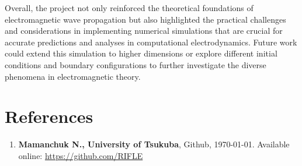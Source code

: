 \documentclass{article}[a4paper]
\begin{document}
Overall, the project not only reinforced the theoretical foundations of electromagnetic wave propagation but also highlighted the practical challenges and considerations in implementing numerical simulations that are crucial for accurate predictions and analyses in computational electrodynamics. Future work could extend this simulation to higher dimensions or explore different initial conditions and boundary configurations to further investigate the diverse phenomena in electromagnetic theory.

\section*{References}
\begin{enumerate}
    \item \textbf{Mamanchuk N., University of Tsukuba}, Github, \today. Available online: \url{https://github.com/RIFLE}
\end{enumerate}
\end{document}
